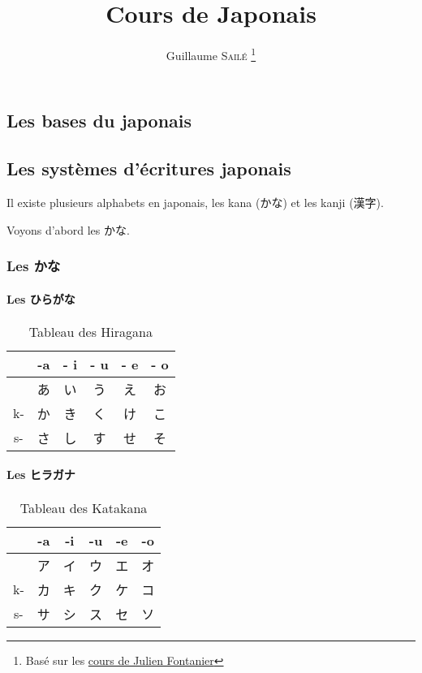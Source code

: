 \documentclass[a4paper]{report}
\title{Cours de Japonais}
\author{Guillaume \textsc{Sailé} \thanks{Basé sur les \href{https://www.youtube.com/channel/UChFfLNTK64xQj7NscGmLLLg}{cours de Julien Fontanier}}}
\date{}
\begin{document}
\begin{CJK}{UTF8}{goth}
\maketitle
\tableofcontents
\part{Les bases du japonais}
\chapter{Les systèmes d'écritures japonais}
Il existe plusieurs alphabets en japonais, les kana (かな) et les kanji (漢字).

Voyons d'abord les かな.
\section{Les かな}
\subsection{Les ひらがな}
\begin{table}[h]
\centering
\begin{tabular}{c|c c c c c}
    & -a & - i & - u & - e & - o\\
    \hline
    & あ & い & う & え & お\\
 k- & か & き & く & け & こ\\
 s- & さ & し & す & せ & そ\\
\end{tabular}
\caption*{Tableau des Hiragana}
\end{table}

\subsection{Les ヒラガナ}
\begin{table}[h]
\centering
\begin{tabular}{c|c c c c c}
    & -a & -i & -u & -e & -o\\
    \hline
    & ア & イ & ウ & エ & オ\\
 k- & カ & キ & ク & ケ & コ\\
 s- & サ & シ & ス & セ & ソ\\
\end{tabular}
\caption*{Tableau des Katakana}
\end{table}

\blindtext

\blindtext

\end{CJK}
\end{document}
